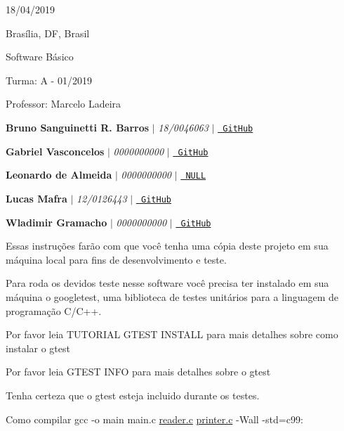 
\begin{DoxyItemize}
\item 18/04/2019
\item Brasília, DF, Brasil
\item Software Básico
\item Turma\+: A -\/ 01/2019
\item Professor\+: Marcelo Ladeira
\end{DoxyItemize}


\begin{DoxyItemize}
\item {\bfseries{Bruno Sanguinetti R. Barros}} $\vert$ {\itshape 18/0046063} $\vert$ \href{https://github.com/BrunoSNT}{\texttt{ Git\+Hub}}
\item {\bfseries{Gabriel Vasconcelos}} $\vert$ {\itshape 0000000000} $\vert$ \href{https://github.com/gcvasconcelos}{\texttt{ Git\+Hub}}
\item {\bfseries{Leonardo de Almeida}} $\vert$ {\itshape 0000000000} $\vert$ \href{https://github.com/}{\texttt{ N\+U\+LL}}
\item {\bfseries{Lucas Mafra}} $\vert$ {\itshape 12/0126443} $\vert$ \href{https://github.com/LMafra}{\texttt{ Git\+Hub}}
\item {\bfseries{Wladimir Gramacho}} $\vert$ {\itshape 0000000000} $\vert$ \href{https://github.com/wladimirgramacho}{\texttt{ Git\+Hub}}
\end{DoxyItemize}

Essas instruções farão com que você tenha uma cópia deste projeto em sua máquina local para fins de desenvolvimento e teste.

Para roda os devidos teste nesse software você precisa ter instalado em sua máquina o googletest, uma biblioteca de testes unitários para a linguagem de programação C/\+C++.

Por favor leia T\+U\+T\+O\+R\+I\+AL G\+T\+E\+ST I\+N\+S\+T\+A\+LL para mais detalhes sobre como instalar o gtest

Por favor leia G\+T\+E\+ST I\+N\+FO para mais detalhes sobre o gtest

Tenha certeza que o gtest esteja incluido durante os testes. 
\begin{DoxyCode}{0}
\end{DoxyCode}


Como compilar {\ttfamily gcc -\/o main main.\+c \mbox{\hyperlink{reader_8c}{reader.\+c}} \mbox{\hyperlink{printer_8c}{printer.\+c}} -\/Wall -\/std=c99}\+: 
\begin{DoxyCode}{0}
\end{DoxyCode}


